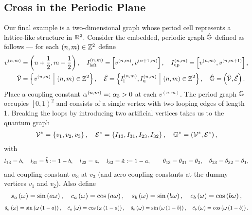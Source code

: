 \subsection{Cross in the Periodic Plane} \label{ssec:ExampleCrossInPlane}
Our final example is a two-dimensional graph whose period cell represents a lattice-like structure in $\mathbb{R}^2$.
Consider the embedded, periodic graph $\hat{\mathbb{G}}$ defined as follows --- for each $\left( n,m \right)\in\mathbb{Z}^2$ define
\begin{align*}
	v^{(n,m)} &= \left( n+\frac{1}{2}, m+\frac{1}{2} \right), \quad
	I_{\mathrm{left}}^{\left( n,m \right)} = \left[ v^{\left( n,m \right)}, v^{\left( n+1,m \right)} \right], \quad
	I_{\mathrm{up}}^{\left( n,m \right)} = \left[ v^{\left( n,m \right)}, v^{\left( n,m+1 \right)} \right], \\
	\hat{\mathcal{V}} &= \left\{ v^{\left( n,m \right)} \ \middle\vert \  \left( n,m \right)\in\mathbb{Z}^2 \right\}, \quad
	\hat{\mathcal{E}} = \left\{  I_{\mathrm{l}}^{\left( n,m \right)}, I_{\mathrm{u}}^{\left( n,m \right)} \ \middle\vert \  \left( n,m \right)\in\mathbb{Z}^2 \right\}, \quad
	\hat{\mathbb{G}} = \left( \hat{\mathcal{V}}, \hat{\mathcal{E}} \right).
\end{align*}
Place a coupling constant $\alpha^{\left( n,m \right)} =: \alpha_3>0$ at each $v^{(n,m)}$.
The period graph $\mathbb{G}$ occupies $\left[0,1\right)^2$ and consists of a single vertex with two looping edges of length 1.
Breaking the loops by introducing two artificial vertices takes us to the quantum graph
\begin{align*}
	\mathcal{V}^* = \left\{ v_1, v_2, v_3 \right\}, \quad
	\mathcal{E}^* = \left\{ I_{13}, I_{31}, I_{23}, I_{32} \right\}, \quad
	\mathbb{G}^* = \left( \mathcal{V}^*, \mathcal{E}^* \right),
\end{align*}
with
\begin{align*}
	l_{13} = b, \quad l_{31} = \tilde{b} := 1-b, \quad 
	l_{23} = a, \quad l_{32} = \tilde{a} := 1-a, \qquad
	\theta_{13} = \theta_{31} = \theta_2, \quad \theta_{23} = \theta_{32} = \theta_1,
\end{align*}
and coupling constant $\alpha_3$ at $v_3$ (and zero coupling constants at the dummy vertices $v_1$ and $v_2$).
Also define
\begin{align*}
	 s_a\left( \omega \right) = \sin\left( a\omega \right), \quad 
	 c_a\left( \omega \right) = \cos\left( a\omega \right), \quad 
	 s_b\left( \omega \right) = \sin\left( b\omega \right), \quad 
	 c_b\left( \omega \right) = \cos\left( b\omega \right),
\end{align*}
\begin{align*}
	 \tilde{s}_a\left( \omega \right) = \sin\left( \omega\left( 1-a \right) \right), \quad 
	 \tilde{c}_a\left( \omega \right) = \cos\left( \omega\left( 1-a \right) \right), \quad 
	 \tilde{s}_b\left( \omega \right) = \sin\left( \omega\left( 1-b \right) \right), \quad 
	 \tilde{c}_b\left( \omega \right) = \cos\left( \omega\left( 1-b \right) \right).
\end{align*}
